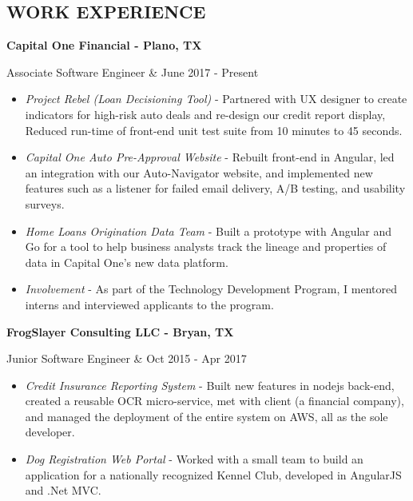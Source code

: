 \documentclass[margin,10pt]{res} %
\begin{document}
\begin{resume}
\section{WORK EXPERIENCE}   
				{\bf Capital One Financial - Plano, TX} \\ 
                \begin{ncolumn}{2} %
                Associate Software Engineer &   June 2017 - Present
                \end{ncolumn}
                \begin{itemize}           
                \item \textit{Project Rebel (Loan Decisioning Tool)} - Partnered with UX designer to create indicators for high-risk auto deals and re-design our credit report display, Reduced run-time of front-end unit test suite from 10 minutes to 45 seconds. 
                \item \textit{Capital One Auto Pre-Approval Website} - Rebuilt front-end in Angular, led an integration with our Auto-Navigator website, and implemented new features such as a listener for failed email delivery, A/B testing, and usability surveys.
                \item \textit{Home Loans Origination Data Team} - Built a prototype with Angular and Go for a tool to help business analysts track the lineage and properties of data in Capital One's new data platform.
                \item \textit{Involvement} - As part of the Technology Development Program, I mentored interns and interviewed applicants to the program.
                \end{itemize}
				{\bf FrogSlayer Consulting LLC - Bryan, TX} \\ 
                \begin{ncolumn}{2} %
                Junior Software Engineer &   Oct 2015 - Apr 2017
                \end{ncolumn}
                \begin{itemize}           
                \item \textit{Credit Insurance Reporting System} - Built new features in nodejs back-end, created a reusable OCR micro-service, met with client (a financial company), and managed the deployment of the entire system on AWS, all as the sole developer.
                \item \textit{Dog Registration Web Portal} - Worked with a small team to build an application for a nationally recognized Kennel Club, developed in AngularJS and .Net MVC.

\end{itemize}
\end{resume}
\end{document}
